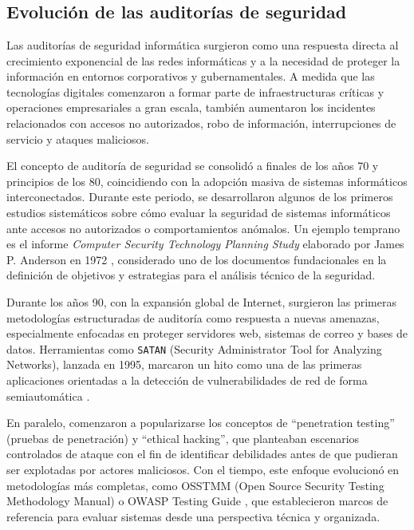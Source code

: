 \chapter{\stateoftheartname}
\newpage
\begin{parskipenv}
\section{Evolución de las auditorías de seguridad}

Las auditorías de seguridad informática surgieron como una respuesta directa al crecimiento exponencial de las redes informáticas y a la necesidad de proteger la información en entornos corporativos y gubernamentales. A medida que las tecnologías digitales comenzaron a formar parte de infraestructuras críticas y operaciones empresariales a gran escala, también aumentaron los incidentes relacionados con accesos no autorizados, robo de información, interrupciones de servicio y ataques maliciosos. 

El concepto de auditoría de seguridad se consolidó a finales de los años 70 y principios de los 80, coincidiendo con la adopción masiva de sistemas informáticos interconectados. Durante este periodo, se desarrollaron algunos de los primeros estudios sistemáticos sobre cómo evaluar la seguridad de sistemas informáticos ante accesos no autorizados o comportamientos anómalos. Un ejemplo temprano es el informe \emph{Computer Security Technology Planning Study} elaborado por James P. Anderson en 1972 \cite{anderson1972a,anderson1972b}, considerado uno de los documentos fundacionales en la definición de objetivos y estrategias para el análisis técnico de la seguridad.

Durante los años 90, con la expansión global de Internet, surgieron las primeras metodologías estructuradas de auditoría como respuesta a nuevas amenazas, especialmente enfocadas en proteger servidores web, sistemas de correo y bases de datos. Herramientas como \texttt{SATAN} (Security Administrator Tool for Analyzing Networks), lanzada en 1995, marcaron un hito como una de las primeras aplicaciones orientadas a la detección de vulnerabilidades de red de forma semiautomática \cite{satanTool1995}.

En paralelo, comenzaron a popularizarse los conceptos de ``penetration testing'' (pruebas de penetración) y ``ethical hacking'', que planteaban escenarios controlados de ataque con el fin de identificar debilidades antes de que pudieran ser explotadas por actores maliciosos. Con el tiempo, este enfoque evolucionó en metodologías más completas, como OSSTMM (Open Source Security Testing Methodology Manual) \cite{osstmm} o OWASP Testing Guide \cite{owasp}, que establecieron marcos de referencia para evaluar sistemas desde una perspectiva técnica y organizada.


\end{parskipenv}
